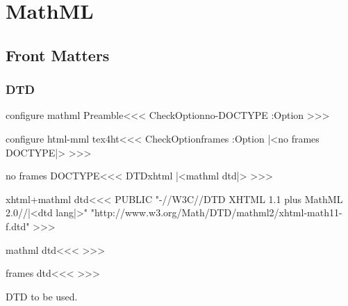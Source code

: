 \chapter{MathML}
\section{Front Matters}



\subsection{DTD}

\<configure mathml Preamble\><<<  
\:CheckOption{no-DOCTYPE} \if:Option
\fi
>>>



\<configure html-mml tex4ht\><<<
\:CheckOption{frames}  \if:Option 
   \else       
      |<no frames DOCTYPE|>
\fi
>>>



\<no frames DOCTYPE\><<<
\def\:temp{xhtml}
\ifx \:DTD\:temp
   |<mathml dtd|>
\fi
>>>

% 

\<xhtml+mathml dtd\><<<
PUBLIC
     "-//W3C//DTD XHTML 1.1 plus MathML 2.0//|<dtd lang|>"\Hnewline
     "http://www.w3.org/Math/DTD/mathml2/xhtml-math11-f.dtd"
>>>

\<mathml dtd\><<<
>>>

\<frames dtd\><<<
   {}
>>>





DTD to be used.

